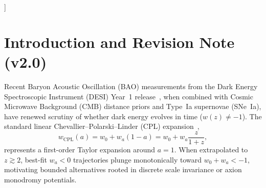 \documentclass[10pt,twocolumn,a4paper]{article}
\begin{document}
{
}]

\section{Introduction and Revision Note (v2.0)}
Recent Baryon Acoustic Oscillation (BAO) measurements from the Dark Energy Spectroscopic Instrument (DESI) Year~1 release~\cite{desi2024}, when combined with Cosmic Microwave Background (CMB) distance priors and Type~Ia supernovae (SNe~Ia), have renewed scrutiny of whether dark energy evolves in time ($w(z) \neq -1$). The standard linear Chevallier--Polarski--Linder (CPL) expansion~\cite{chevallier2001,linder2003},
\begin{equation}
w_{\mathrm{CPL}}(a) = w_0 + w_a(1-a) = w_0 + w_a \frac{z}{1+z},
\label{eq:cpl}
\end{equation}
represents a first-order Taylor expansion around $a=1$. When extrapolated to $z \gtrsim 2$, best-fit $w_a < 0$ trajectories plunge monotonically toward $w_0 + w_a < -1$, motivating bounded alternatives rooted in discrete scale invariance or axion monodromy potentials.
\end{document}
